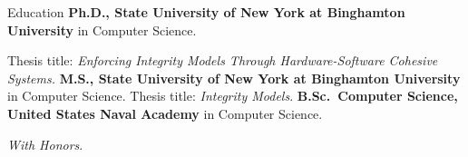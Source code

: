 
\begin{rubric}{Education}
\entry*[2018 -- 2024 (expected)]%
	\textbf{Ph.D., State University of New York at Binghamton University} in Computer Science.
	\par Thesis title: \emph{Enforcing Integrity Models Through Hardware-Software Cohesive Systems.}
%
\entry*[2015 -- 2018]%
	\textbf{M.S., State University of New York at Binghamton University} in Computer Science.
	Thesis title: \emph{Integrity Models}.
% 
\entry*[2001 -- 2005]%
	\textbf{B.Sc.~Computer Science, United States Naval Academy} in Computer Science.
	\par \textit{With Honors}.
\end{rubric}